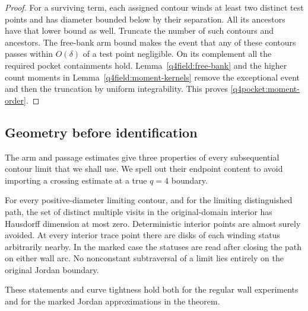 \begin{proof}
For a surviving term, each assigned contour winds at least two distinct
test points and has diameter bounded below by their separation.  All
its ancestors have that lower bound as well.  Truncate the number of
such contours and ancestors.  The free-bank arm bound makes the event
that any of these contours passes within $O(\delta)$ of a test point
negligible.  On its complement all the required pocket containments
hold.  Lemma~\ref{q4field:free-bank} and the higher count moments
in Lemma~\ref{q4field:moment-kernels} remove the exceptional event
and then the truncation by uniform integrability.  This proves
\eqref{q4pocket:moment-order}.
\end{proof}

\subsection{Geometry before identification}

The arm and passage estimates give three properties of every
subsequential contour limit that we shall use.  We spell out their
endpoint content to avoid importing a crossing estimate at a true
$q=4$ boundary.

\begin{lemma}
\label{q4pocket:geometry}
For every positive-diameter limiting contour, and for the limiting
distinguished path, the set of distinct multiple visits in the
original-domain interior has Hausdorff dimension at most zero.
Deterministic interior points are almost surely avoided.  At every
interior trace point there are disks of each winding status arbitrarily
nearby.  In the marked case the statuses are read after closing the
path on either wall arc.  No nonconstant subtraversal of a limit lies
entirely on the original Jordan boundary.

These statements and curve tightness hold both for the regular wall
experiments and for the marked Jordan approximations in the theorem.
\end{lemma}

